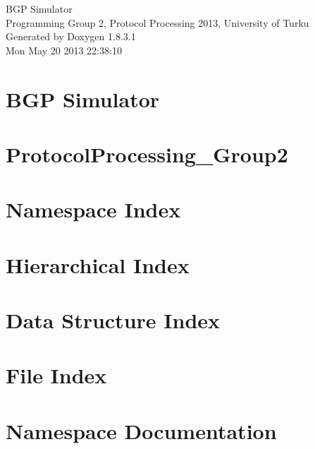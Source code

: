 \documentclass{book}
\begin{document}
\hypersetup{pageanchor=false,citecolor=blue}
\begin{titlepage}
\vspace*{7cm}
\begin{center}
{\Large B\-G\-P Simulator \\[1ex]\large Programming Group 2, Protocol Processing 2013, University of Turku }\\
\vspace*{1cm}
{\large Generated by Doxygen 1.8.3.1}\\
\vspace*{0.5cm}
{\small Mon May 20 2013 22:38:10}\\
\end{center}
\end{titlepage}
\clearemptydoublepage
{}
\tableofcontents
\clearemptydoublepage
{}
\hypersetup{pageanchor=true,citecolor=blue}
\chapter{B\-G\-P Simulator}
\label{index}\hypertarget{index}{}
\chapter{Protocol\-Processing\-\_\-\-Group2}
\label{md_README}
\hypertarget{md_README}{}

\chapter{Namespace Index}

\chapter{Hierarchical Index}

\chapter{Data Structure Index}

\chapter{File Index}

\chapter{Namespace Documentation}


\end{document}
